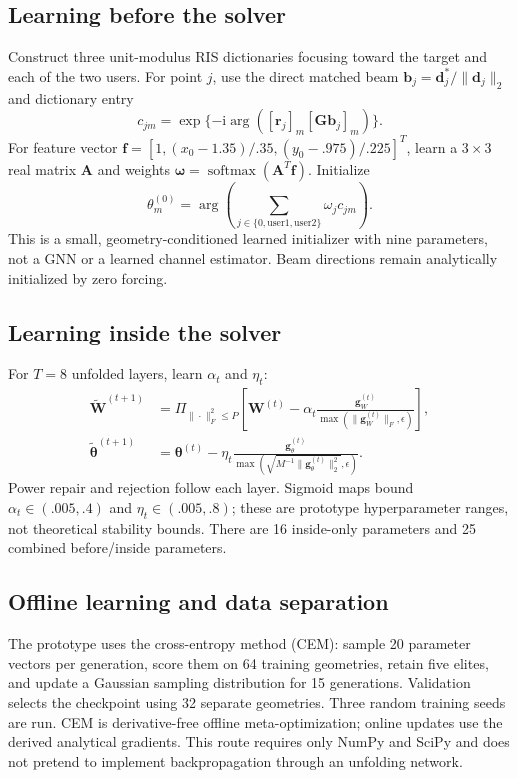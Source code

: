 \documentclass[11pt,a4paper]{article}
\begin{document}
\subsection{Learning before the solver}
Construct three unit-modulus RIS dictionaries focusing toward the target and each of the two users. For point $j$, use the direct matched beam $\mathbf b_j=\mathbf d_j^*/\|\mathbf d_j\|_2$ and dictionary entry
\begin{equation}
 c_{jm}=\exp\{-\mathrm i\arg([\mathbf r_j]_m[\mathbf G\mathbf b_j]_m)\}.
\end{equation}
For feature vector $\mathbf f=[1,(x_0-1.35)/.35,(y_0-.975)/.225]^T$, learn a $3\times3$ real matrix $\mathbf A$ and weights $\boldsymbol\omega=\operatorname{softmax}(\mathbf A^T\mathbf f)$. Initialize
\begin{equation}
 \theta_m^{(0)}=\arg\left(\sum_{j\in\{0,\mathrm{user1},\mathrm{user2}\}}\omega_j c_{jm}\right).
\end{equation}
This is a small, geometry-conditioned learned initializer with nine parameters, not a GNN or a learned channel estimator. Beam directions remain analytically initialized by zero forcing.

\subsection{Learning inside the solver}
For $T=8$ unfolded layers, learn $\alpha_t$ and $\eta_t$:
\begin{align}
 \widetilde{\mathbf W}^{(t+1)}&=\Pi_{\|\cdot\|_F^2\leq P}
 \left[\mathbf W^{(t)}-\alpha_t\frac{\mathbf g_W^{(t)}}{\max(\|\mathbf g_W^{(t)}\|_F,\epsilon)}\right],\\
 \widetilde{\boldsymbol\theta}^{(t+1)}&=\boldsymbol\theta^{(t)}-
 \eta_t\frac{\mathbf g_\theta^{(t)}}{\max(\sqrt{M^{-1}\|\mathbf g_\theta^{(t)}\|_2^2},\epsilon)}.
\end{align}
Power repair and rejection follow each layer. Sigmoid maps bound $\alpha_t\in(.005,.4)$ and $\eta_t\in(.005,.8)$; these are prototype hyperparameter ranges, not theoretical stability bounds. There are 16 inside-only parameters and 25 combined before/inside parameters.

\subsection{Offline learning and data separation}
The prototype uses the cross-entropy method (CEM): sample 20 parameter vectors per generation, score them on 64 training geometries, retain five elites, and update a Gaussian sampling distribution for 15 generations. Validation selects the checkpoint using 32 separate geometries. Three random training seeds are run. CEM is derivative-free offline meta-optimization; online updates use the derived analytical gradients. This route requires only NumPy and SciPy and does not pretend to implement backpropagation through an unfolding network.
\end{document}
